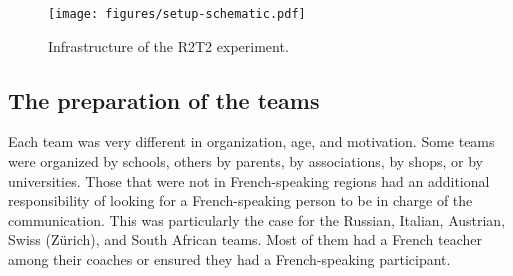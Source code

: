 \documentclass{intech-journal}
\begin{document}
\begin{figure}[ht]
 \centering
    \texttt{[image: figures/setup-schematic.pdf]}
  \caption{Infrastructure of the R2T2 experiment.}
  \label{fig:setup-scheme} 
\end{figure}

\subsection{The preparation of the teams}

Each team was very different in organization, age, and motivation.
Some teams were organized by schools, others by parents, by associations, by shops, or by universities. 
Those that were not in French-speaking regions had an additional responsibility of looking for a French-speaking person to be in charge of the communication. 
This was particularly the case for the Russian, Italian, Austrian, Swiss (Z\"urich), and South African teams. 
Most of them had a French teacher among their coaches or ensured they had a French-speaking participant. 
\end{document}
